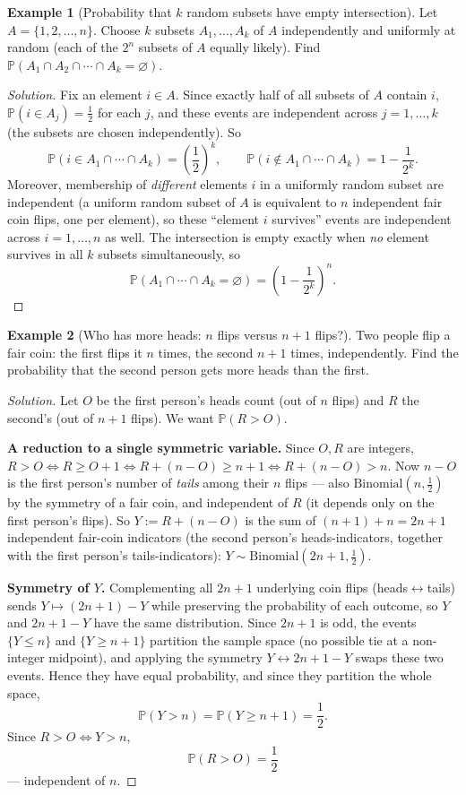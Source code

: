 \documentclass[11pt]{article}
\theoremstyle{definition}
\newtheorem{example}{Example}[section]
\begin{document}
\begin{example}[Probability that $k$ random subsets have empty intersection]
Let $A=\{1,2,\dots,n\}$. Choose $k$ subsets $A_1,\dots,A_k$ of $A$ independently and uniformly at random (each of the $2^n$ subsets of $A$ equally likely). Find $\mathbb P(A_1\cap A_2\cap\cdots\cap A_k=\varnothing)$.
\end{example}
\begin{proof}[Solution]
Fix an element $i\in A$. Since exactly half of all subsets of $A$ contain $i$, $\mathbb P(i\in A_j)=\tfrac12$ for each $j$, and these events are independent across $j=1,\dots,k$ (the subsets are chosen independently). So
\[
\mathbb P(i\in A_1\cap\cdots\cap A_k)=\left(\frac12\right)^k,\qquad \mathbb P(i\notin A_1\cap\cdots\cap A_k)=1-\frac1{2^k}.
\]
Moreover, membership of \emph{different} elements $i$ in a uniformly random subset are independent (a uniform random subset of $A$ is equivalent to $n$ independent fair coin flips, one per element), so these ``element $i$ survives'' events are independent across $i=1,\dots,n$ as well. The intersection is empty exactly when \emph{no} element survives in all $k$ subsets simultaneously, so
\[
\boxed{\mathbb P(A_1\cap\cdots\cap A_k=\varnothing)=\left(1-\frac1{2^k}\right)^{n}}.
\]
\end{proof}

\begin{example}[Who has more heads: $n$ flips versus $n+1$ flips?]
Two people flip a fair coin: the first flips it $n$ times, the second $n+1$ times, independently. Find the probability that the second person gets more heads than the first.
\end{example}
\begin{proof}[Solution]
Let $O$ be the first person's heads count (out of $n$ flips) and $R$ the second's (out of $n+1$ flips). We want $\mathbb P(R>O)$.

\textbf{A reduction to a single symmetric variable.} Since $O,R$ are integers, $R>O\iff R\ge O+1\iff R+(n-O)\ge n+1\iff R+(n-O)>n$. Now $n-O$ is the first person's number of \emph{tails} among their $n$ flips — also $\mathrm{Binomial}(n,\tfrac12)$ by the symmetry of a fair coin, and independent of $R$ (it depends only on the first person's flips). So $Y:=R+(n-O)$ is the sum of $(n+1)+n=2n+1$ independent fair-coin indicators (the second person's heads-indicators, together with the first person's tails-indicators): $Y\sim\mathrm{Binomial}(2n+1,\tfrac12)$.

\textbf{Symmetry of $Y$.} Complementing all $2n+1$ underlying coin flips (heads$\leftrightarrow$tails) sends $Y\mapsto(2n+1)-Y$ while preserving the probability of each outcome, so $Y$ and $2n+1-Y$ have the same distribution. Since $2n+1$ is odd, the events $\{Y\le n\}$ and $\{Y\ge n+1\}$ partition the sample space (no possible tie at a non-integer midpoint), and applying the symmetry $Y\leftrightarrow2n+1-Y$ swaps these two events. Hence they have equal probability, and since they partition the whole space,
\[
\mathbb P(Y>n)=\mathbb P(Y\ge n+1)=\frac12.
\]
Since $R>O\iff Y>n$,
\[
\boxed{\mathbb P(R>O)=\frac12}
\]
— independent of $n$.
\end{proof}
\end{document}
